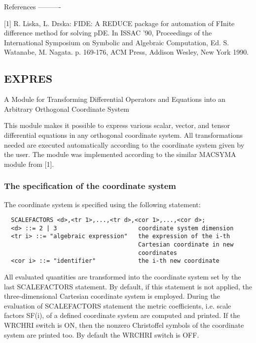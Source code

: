 References
----------

[1] R. Liska, L. Drska: FIDE: A REDUCE package for automation of  FInite
      difference method for  solving pDE. In  ISSAC '90, Proceedings  of
      the International Symposium on Symbolic and Algebraic Computation,
      Ed. S. Watanabe, M. Nagata. p. 169-176, ACM Press, Addison Wesley,
      New York 1990.




\subsection{EXPRES}




                A Module for Transforming Differential
         Operators and Equations into an Arbitrary Orthogonal
                           Coordinate System



     This module  makes it  possible to  express various scalar, vector,
and tensor differential equations  in any  orthogonal coordinate system.
All transformations  needed are  executed automatically according to the
coordinate  system  given  by  the  user.  The  module  was  implemented
according to the similar MACSYMA module from [1].


\subsubsection{The specification of the coordinate system}

The coordinate system is specified using the following statement:
\begin{verbatim}
  SCALEFACTORS <d>,<tr 1>,...,<tr d>,<cor 1>,...,<cor d>;
  <d> ::= 2 | 3                       coordinate system dimension
  <tr i> ::= "algebraic expression"   the expression of the i-th
                                      Cartesian coordinate in new
                                      coordinates
  <cor i> ::= "identifier"            the i-th new coordinate
\end{verbatim}
All evaluated  quantities are transformed into the coordinate system set
by the last SCALEFACTORS statement. By default, if this statement is not
applied, the  three-dimensional Cartesian coordinate system is employed.
During the evaluation of SCALEFACTORS statement the metric coefficients,
i.e. scale  factors SF(i),  of a  defined coordinate system are computed
and printed. If the WRCHRI switch  is ON,  then the  nonzero Christoffel
symbols of the coordinate system are printed too. By  default the WRCHRI
switch is OFF.

